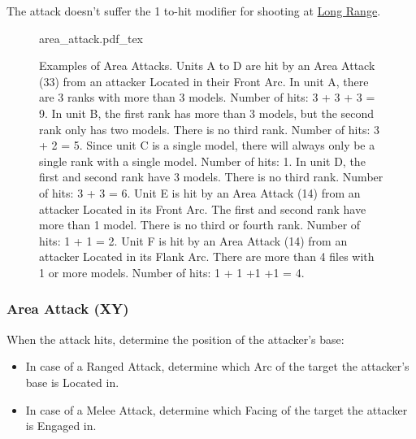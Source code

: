 The attack doesn't suffer the \minuss{}1 to-hit modifier for shooting at \hyperref[long_range]{Long Range}.

\newcommand{\figAATotalA}{3 + 3 + 3 = 9 Hits}
\newcommand{\figAATotalB}{3 + 2 = 5 Hits}
\newcommand{\figAATotalC}{1 Hit}
\newcommand{\figAATotalD}{3 + 3 = 6 Hits}
\newcommand{\figAATotalE}{1 + 1 = 2 Hits}
\newcommand{\figAATotalF}{1 + 1 + 1 + 1 = 4 Hits}
\newcommand{\figAAAreaAttack}[1]{\areaattack{#1}}

\begin{figure}[!t]
	\centering
	\def\svgwidth{0.8\textwidth}
	{area_attack.pdf_tex}
	\caption{Examples of Area Attacks.\captionposttitle%
		Units A to D are hit by an Area Attack (3\timess{}3) from an attacker Located in their Front Arc.\captionpar
		In unit A, there are 3 ranks with more than 3 models. Number of hits: 3 + 3 + 3 = 9.\captionpar
		 In unit B, the first rank has more than 3 models, but the second rank only has two models. There is no third rank.
		Number of hits: 3 + 2 = 5.\captionpar
		Since unit C is a single model, there will always only be a single rank with a single model. Number of hits: 1.\captionpar
		In unit D, the first and second rank have 3 models. There is no third rank. Number of hits: 3 + 3 = 6.\captionpar
		Unit E is hit by an Area Attack (1\timess{}4) from an attacker Located in its Front Arc. The first and second rank have more than 1 model. There is no third or fourth rank. Number of hits: 1 + 1 = 2.\captionpar
		Unit F is hit by an Area Attack (1\timess{}4) from an attacker Located in its Flank Arc. There are more than 4 files with 1 or more models. Number of hits: 1 + 1 +1 +1 = 4.%
	}
	\label{figure/area_attack}
\end{figure}

\subsubsection{Area Attack (X\timess{}Y)}
\idx[main=y]{\areaattack{}}\label{area_attack}

When the attack hits, determine the position of the attacker's base:
\begin{itemize}
	\item In case of a Ranged Attack, determine which Arc of the target the attacker's base is Located in.
	\item In case of a Melee Attack, determine which Facing of the target the attacker is Engaged in.
\end{itemize}

